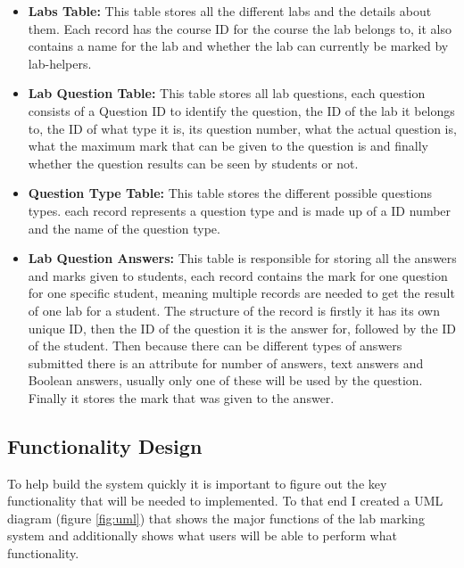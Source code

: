 \documentclass[12pt]{article}  %
\begin{document}
\begin{itemize}
    \item \textbf{Labs Table:} This table stores all the different labs and the details about them. Each record has the course ID for the course the lab belongs to, it also contains a name for the lab and whether the lab can currently be marked by lab-helpers.  
    
    \item \textbf{Lab Question Table:} This table stores all lab questions, each question consists of a Question ID to identify the question, the ID of the lab it belongs to, the ID of what type it is, its question number, what the actual question is, what the maximum mark that can be given to the question is and finally whether the question results can be seen by students or not.
    
    \item \textbf{Question Type Table:} This table stores the different possible questions types. each record represents a question type and is made up of a ID number and the name of the question type.
    
    \item \textbf{Lab Question Answers:} This table is responsible for storing all the answers and marks given to students, each record contains the mark for one question for one specific student, meaning multiple records are needed to get the result of one lab for a student. The structure of the record is firstly it has its own unique ID, then the ID of the question it is the answer for, followed by the ID of the student. Then because there can be different types of answers submitted there is an attribute for number of answers, text answers and Boolean answers, usually only one of these will be used by the question. Finally it stores the mark that was given to the answer.
\end{itemize}


\subsection{Functionality Design}

To help build the system quickly it is important to figure out the key functionality that will be needed to implemented. To that end I created a UML diagram (figure \ref{fig:uml}) that shows the major functions of the lab marking system and additionally shows what users will be able to perform what functionality.
\end{document}
